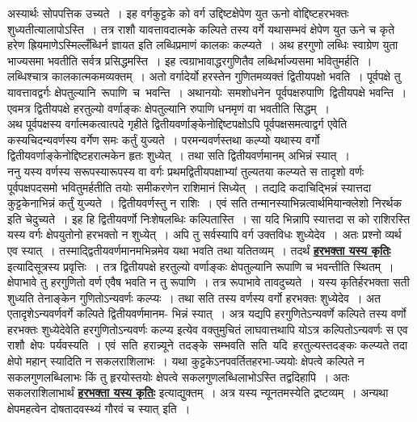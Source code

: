 \documentclass[11pt, openany]{book}
\begin{document}
  अस्यार्थः सोपपत्तिक उच्यते~। इह वर्गकुट्टके को वर्ग उद्दिष्टक्षेपेण
युत ऊनो
 वोद्दिष्टहरभक्तः शुध्यतीत्यालापोऽस्ति~। तत्र राशौ यावत्तावदात्मके
कल्पिते तस्य वर्गे
 यथासम्भवं क्षेपेण युत ऊने च कृते हरेण ह्रियमाणेऽस्मिल्लँब्धिर्न ज्ञायत
इति लब्धिप्रमाणं कालकः कल्प्यते~। अथ हरगुणो लब्धिः स्वाग्रेण युता भाज्यसमा
भवतीति सर्वत्र प्रसिद्धमस्ति~। इह त्वग्राभावाद्धरगुणितैव लब्धिर्भाज्यसमा भवितुमर्हति~।
लब्धिश्चात्र कालकात्मकमव्यक्तम्~। अतो वर्गादेर्यो हरस्तेन गुणितमव्यक्तं
द्वितीयपक्षो भवति~। पूर्वपक्षे तु यावत्तावद्वर्गः क्षेपतुल्यानि \,रूपाणि \,च \,भवन्ति~। अथानयोः \,समशोधनेन \,पूर्वपक्षरुपाणि \,द्वितीयपक्षे भवन्ति~। एवमत्र द्वितीयपक्षे हरतुल्यो
वर्णाङ्कः क्षेपतुल्यानि रुपाणि धनमृणं वा भवतीति सिद्धम्~। \\

\vspace{-4mm}
 अथ पूर्वपक्षस्य वर्गात्मकत्वात्पदे गृहीते
द्वितीयवर्णाङ्केनोद्दिष्टपक्षोऽपि पूर्वपक्षसमत्वाद्वर्ग एवेति कस्यचिदन्यवर्णस्य वर्गेण समः कर्तुं युज्यते~। परमन्यवर्णस्तथा कल्प्यो यथास्य वर्गो द्वितीयवर्णाङ्केनोद्दिष्टहरात्मकेन हृतः शुध्येत्~। तथा सति द्वितीयवर्णमानम् अभिन्नं स्यात्~। \\

\vspace{-4mm}
ननु यस्य वर्णस्य सरूपस्यारूपस्य वा वर्गः प्रथमद्वितीयपक्षाभ्यां
तुल्यतया कल्प्यते
स तादृशो वर्णः पूर्वपक्षपदसमो भवितुमर्हतीति तयोः समीकरणेन राशिमानं
सिध्येत्~। तद्यदि कदाचिद्भिन्नं स्यात्तदा कुट्टकेनाभिन्नं कर्तुं युज्यते~।
द्वितीयवर्णस्तु न राशिः~।
 एवं सति तन्मानस्याभिन्नत्वार्थमियान्क्लेशो निरर्थक इति चेदुच्यते~। इह
हि द्वितीयवर्णो निःशेषलब्धिः कल्पितास्ति~। सा यदि भिन्नापि स्यात्तदा स को
राशिरस्ति यस्य वर्गः क्षेपयुतोनो हरभक्तो न शुध्येत्~। अपि तु सर्वस्यापि वर्ग
उक्तविधः शुध्येदेव~। अतः प्रश्नो व्यर्थ एव स्यात्~।
तस्माद्द्वितीयवर्णमानमभिन्नमेव यथा भवति
 तथा यतितव्यम्~। तदर्थं \hyperref[178]{\textbf{हरभक्ता यस्य कृतिः}} इत्यादिसूत्रस्य प्रवृत्तिः~। तत्र द्वितीयपक्षे हरतुल्यो वर्णाङ्कः क्षेपतुल्यानि रूपाणि च भवन्तीति स्थितम्~। क्षेपाभावे तु हरगुणितो वर्ण एवैष भवति न तु रूपाणि~। तत्र रूपाभावे तावदुच्यते~।
यस्य कृतिर्हरभक्ता सती शुध्यति तेनाङ्केन गुणितोऽन्यवर्णः कल्प्यः~। तथा सति तस्य
वर्णस्य वर्गो हरभक्तः शुध्येदेव~। अत एतादृशेऽन्यवर्णवर्गे कल्पिते द्वितीयवर्णमानम-
\newpage%
\noindent भिन्नं स्यात्~। अत्र यद्यपि हरगुणितेऽन्यवर्णे कल्पिते तस्य वर्णो हरभक्तः शुध्येदेवेति
 हरगुणितोऽन्यवर्णः कल्प्य इत्येव वक्तुमुचितं लाघवात्तथापि योऽत्र
कल्पितोऽन्यवर्णः 
स एव राशौ \,क्षेपः \,पर्यवस्यति~। एवं \,सति \,हरान्न्यूने \,तदङ्के \,सम्भवति \,सति \,यदि \,हरतुल्यस्तदङ्कः कल्प्यते तदा क्षेपो महान् स्यादिति न सकलराशिलाभः~।
यथा कुट्टकेऽनपवर्तितहरभा-ज्ययोः क्षेपत्वे कल्पिते न सकलगुणलब्धिलाभः किं तु
हृरयोस्तयोः
 क्षेपत्वे सकलगुणलब्धिलाभोऽस्ति तद्वदिहापि~। अतः सकलराशिलाभार्थं
\hyperref[178]{\textbf{हरभक्ता यस्य कृतिः}} इत्याद्युक्तम्~। अत्र यस्य न्यूनतमस्येति द्रष्टव्यम्~।
अन्यथा क्षेपमहत्वेन दोषतादवस्थ्यं गौरवं च स्यात् इति~। \\
\end{document}
